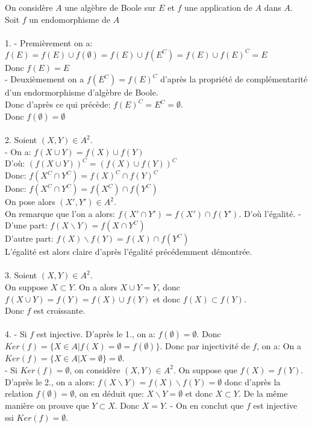 \documentclass{article}
\begin{document}
			On considère $A$ une algèbre de Boole sur $E$ et $f$ une application de $A$ dans $A$.\\
			Soit $f$ un endomorphisme de $A$\\\\
			1. - Premièrement on a: $f(E)=f(E) \cup f(\emptyset)=f(E) \cup f(E^C)=f(E) \cup f(E)^C=E$\\
			Donc $f(E)=E$\\
			- Deuxièmement on a $f(E^C)=f(E)^C$ d'après la propriété de complémentarité d'un endormorphisme d'algèbre de Boole.\\
			Donc d'après ce qui précède: $f(E)^C=E^C=\emptyset$.\\
			Donc $f(\emptyset)=\emptyset$\\\\
			2. Soient $(X,Y) \in A^2$.\\
			- On a: $f(X \cup Y)=f(X) \cup f(Y)$\\
			D'où: $(f(X \cup Y))^C=(f(X) \cup f(Y))^C$\\
			Donc: $f(X^C \cap Y^C)=f(X)^C \cap f(Y)^C$\\
			Donc: $f(X^C \cap Y^C)=f(X^C) \cap f(Y^C)$\\
			On pose alors $(X',Y') \in A^2$.\\
			On remarque que l'on a alors: $f(X' \cap Y')=f(X') \cap f(Y')$. D'où l'égalité.
			- D'une part: $f(X \backslash Y)=f(X \cap Y^C)$\\
			D'autre part: $f(X) \backslash f(Y)=f(X) \cap f(Y^C)$\\
			L'égalité est alors claire d'après l'égalité précédemment démontrée.\\\\
			3. Soient $(X,Y) \in A^2$.\\
			On suppose $X \subset Y$.
			On a alors $X \cup Y=Y$, donc $f(X \cup Y)=f(Y)=f(X) \cup f(Y)$ et donc $f(X) \subset f(Y)$.\\
			Donc $f$ est croissante.\\\\
			4. - Si $f$ est injective. D'après le 1., on a: $f(\emptyset)=\emptyset$. Donc $Ker(f)= \{ X \in A | f(X)=\emptyset=f(\emptyset) \} $. Donc par injectivité de $f$, on a: On a $Ker(f)= \{ X \in A | X = \emptyset \} =\emptyset$.\\
			- Si $Ker(f)=\emptyset$, on considère $(X,Y) \in A^2$. On suppose que $f(X)=f(Y)$. D'après le 2., on a alors: $f(X \backslash Y)=f(X) \backslash f(Y) = \emptyset$ donc d'après la relation $f(\emptyset)=\emptyset$, on en déduit que: $X \backslash Y=\emptyset$ et donc $X \subset Y$. De la même manière on prouve que $Y \subset X$. Donc $X=Y$.
			- On en conclut que $f$ est injective ssi $Ker(f)=\emptyset$.
			
			
			
			
		
		
		
\end{document}
